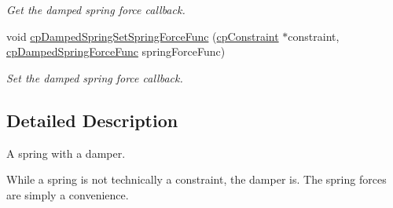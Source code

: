 \begin{DoxyCompactItemize}
\begin{DoxyCompactList}\small\item\em Get the damped spring force callback. \end{DoxyCompactList}\item 
\hypertarget{group__cp_damped_spring_ga784a8fae3e1af7f40f57d80ab973df1c}{}void \hyperlink{group__cp_damped_spring_ga784a8fae3e1af7f40f57d80ab973df1c}{cp\+Damped\+Spring\+Set\+Spring\+Force\+Func} (\hyperlink{structcp_constraint}{cp\+Constraint} $\ast$constraint, \hyperlink{group__cp_damped_spring_gad88d8466e0057d4ad05183fb14fa274d}{cp\+Damped\+Spring\+Force\+Func} spring\+Force\+Func)\label{group__cp_damped_spring_ga784a8fae3e1af7f40f57d80ab973df1c}

\begin{DoxyCompactList}\small\item\em Set the damped spring force callback. \end{DoxyCompactList}\end{DoxyCompactItemize}


\subsection{Detailed Description}
A spring with a damper. 

While a spring is not technically a constraint, the damper is. The spring forces are simply a convenience. 
